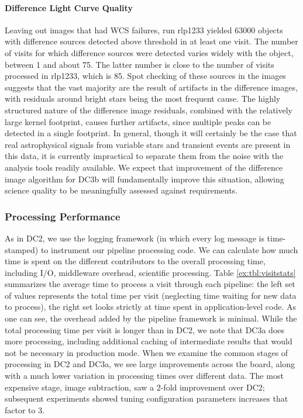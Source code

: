 \paragraph{Difference Light Curve Quality}
Leaving out images that had WCS failures, run rlp1233 yielded 63000
objects with difference sources detected above threshold in at least
one visit. The number of visits
for which difference sources were detected varies widely with the object, between 1 and
about 75.  The latter number is close to the number of visits
processed in rlp1233, which is 85.  Spot checking of these sources in
the images suggests that the vast majority are the result of artifacts
in the difference images, with residuals around bright stars being the
most frequent cause.  The highly structured nature of the difference
image residuals, combined with the relatively large kernel footprint,
causes further artifacts, since multiple peaks can be detected in a
single footprint.  In general, though it will certainly be the case
that real astrophysical signals from variable stars and transient
events are present in this data, it is currently impractical to
separate them from the noise with the analysis tools readily
available.  We expect that improvement of the difference image
algorithm for DC3b will fundamentally improve this situation, allowing
science quality to be meaningfully assessed against requirements.

\subsubsection*{Processing Performance}

As in DC2, we use the logging framework (in which every log message is
time-stamped) to instrument our pipeline processing code.  We can
calculate how much time is spent on the different contributors to the
overall processing time, including I/O, middleware overhead,
scientific processing.  Table \ref{ex:tbl:visitstats} summarizes the
average time to process a visit through each pipeline: the left set of
values represents the total time per visit (neglecting time waiting
for new data to process), the right set looks strictly at time spent
in application-level code.  As one can see, the overhead added by the
pipeline framework is minimal.  While the total processing time per
visit is longer than in DC2, we note that DC3a does more processing,
including additional caching of intermediate results that would not be
necessary in production mode.  When we examine the common stages of
processing in DC2 and DC3a, we see large improvements across the
board, along with a much lower variation in processing times over
different data.  The most expensive stage, image subtraction, saw a
2-fold improvement over DC2; subsequent experiments showed tuning
configuration parameters increases that factor to 3.

